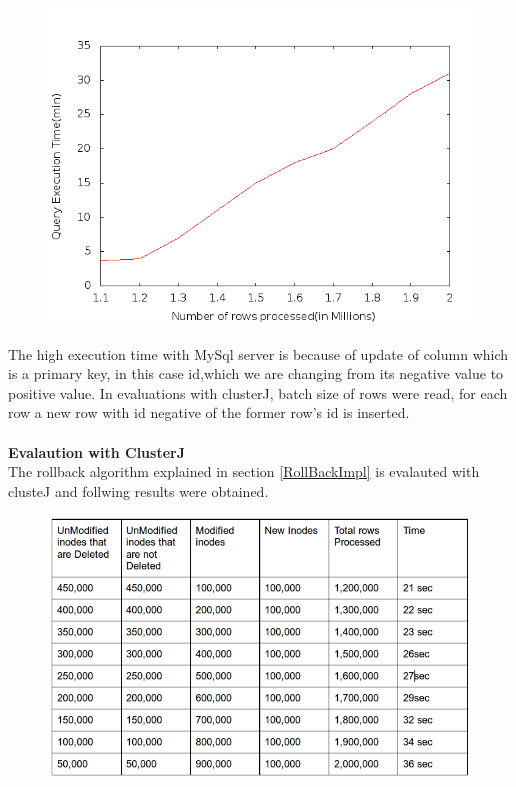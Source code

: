 \begin{figure}
\includegraphics[scale=0.65]{figs/preliminar/MySqlServerSingleSnapshotEvalGraph.png}
\label{fig:MySqlServerSSEGraph}%
\end{figure}

The high execution time with MySql server is because of update of column which is a primary key, in this case id,which we are changing from its negative value to positive value. In evaluations with clusterJ, batch size of rows were read, for each row a new row with id negative of the former row's id is inserted. \\\\
\textbf{Evalaution with ClusterJ}\\
The rollback algorithm explained in section \ref{RollBackImpl} is evalauted with clusteJ and follwing results were obtained.

\begin{figure}
\includegraphics[scale=0.65]{figs/preliminar/ClusterJSingleSnapshotEval.png}
\label{fig:ClusterJSSE}%
\end{figure}

